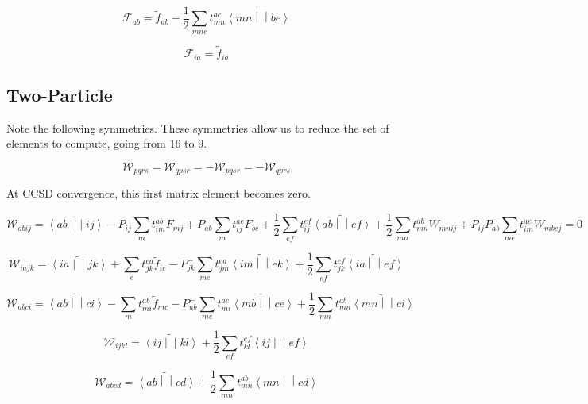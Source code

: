 \documentclass{article}
\newcommand{\tei}[2]{\left<{#1}\middle|\middle|{#2}\right>}
\begin{document}
\begin{equation}
  \mathcal{F}_{ab} = \tilde{f}_{ab} - \frac{1}{2}\sum_{mne}t_{mn}^{ae}\tei{mn}{be}
\end{equation}

\begin{equation}
  \mathcal{F}_{ia} = \tilde{f}_{ia}
\end{equation}

\subsection{Two-Particle}
Note the following symmetries. These symmetries allow us to reduce the set of elements to compute, going from 16 to 9.

\begin{equation}
  \mathcal{W}_{pqrs} = \mathcal{W}_{qpsr} = -\mathcal{W}_{pqsr} = -\mathcal{W}_{qprs}
\end{equation}

At CCSD convergence, this first matrix element becomes zero.

\begin{equation}
  \mathcal{W}_{abij} = \widetilde{\tei{ab}{ij}} - P_{ij}^-\sum_mt_{im}^{ab}F_{mj} + P_{ab}^-\sum_mt_{ij}^{ae}F_{be} + \frac{1}{2}\sum_{ef}t_{ij}^{ef}\widetilde{\tei{ab}{ef}} + \frac{1}{2}\sum_{mn}t_{mn}^{ab}W_{mnij} + P_{ij}^-P_{ab}^-\sum_{me}t_{im}^{ae}W_{mbej} = 0
\end{equation}

\begin{equation}
  \mathcal{W}_{iajk} = \widetilde{\tei{ia}{jk}} + \sum_et_{jk}^{ea}\tilde{f}_{ie} - P_{jk}^-\sum_{me}t_{jm}^{ea}\widetilde{\tei{im}{ek}} + \frac{1}{2}\sum_{ef}t_{jk}^{ef}\widetilde{\tei{ia}{ef}}
\end{equation}

\begin{equation}
  \mathcal{W}_{abci} = \widetilde{\tei{ab}{ci}} - \sum_mt_{mi}^{ab}\tilde{f}_{mc} - P_{ab}^-\sum_{me}t_{mi}^{ae}\widetilde{\tei{mb}{ce}} + \frac{1}{2}\sum_{mn}t_{mn}^{ab}\widetilde{\tei{mn}{ci}}
\end{equation}

\begin{equation}
  \mathcal{W}_{ijkl} = \widetilde{\tei{ij}{kl}} + \frac{1}{2}\sum_{ef}t_{kl}^{ef}\tei{ij}{ef}
\end{equation}

\begin{equation}
  \mathcal{W}_{abcd} = \widetilde{\tei{ab}{cd}} + \frac{1}{2}\sum_{mn}t_{mn}^{ab}\tei{mn}{cd}
\end{equation}
\end{document}
